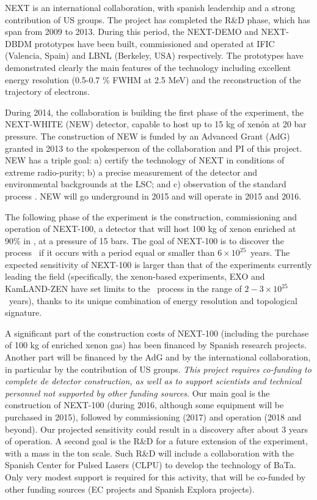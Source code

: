 \documentclass[a4paper,11pt,oneside]{article}
\begin{document}
NEXT is an international collaboration, with spanish leadership and a strong contribution of US groups. The project has completed the R\&D phase, which has span from 2009 to 2013. During this period, the NEXT-DEMO and NEXT-DBDM prototypes have been built, commissioned and operated at IFIC (Valencia, Spain) and LBNL (Berkeley, USA) respectively. The prototypes have demonstrated clearly the main features of the technology including excellent energy resolution (0.5-0.7 \% FWHM at 2.5 MeV) and the reconstruction of the trajectory of electrons.

During 2014, the collaboration is building the first phase of the experiment, the NEXT-WHITE (NEW) detector, capable to host up to 15 kg of xenón at 20 bar pressure. The construction of NEW is funded by an Advanced Grant (AdG) granted in 2013 to the spokesperson of the collaboration and PI of this project. NEW has a triple goal: a) certify the technology of NEXT in conditions of extreme radio-purity; b) a precise measurement of the detector and environmental backgrounds at the LSC; and c) observation of the standard process \bbtnu. NEW will go underground in 2015 and will operate in 2015 and 2016.  

The following phase of the experiment is the construction, commissioning and operation of NEXT-100, a detector that will host 100 kg of xenon enriched at 90\% in \XE, at a pressure of 15 bars. The goal of NEXT-100 is to discover the process \bbonu\ if it occurs with a period equal or smaller than  $6 \times 10^{25}$~years. The expected sensitivity of NEXT-100 is larger than that of the experiments currently leading the field (specifically, the xenon-based experiments, EXO and KamLAND-ZEN have set limits to the \bbonu\ process in the range of $2-3 \times 10^{25}$~years), thanks to its unique combination of energy resolution and topological signature. 

A significant part of the construction costs of NEXT-100 (including the purchase of 100 kg of enriched xenon gas) has been financed by Spanish research projects. Another part will be financed by the AdG and by the international collaboration, in particular by the contribution of US groups. {\em This project requires co-funding to complete de detector construction, as well as to support scientists and technical personnel not supported by other funding sources}. Our main goal is the construction of NEXT-100 (during 2016, although some equipment will be purchased in 2015), followed by commissioning (2017) and operation (2018 and beyond). Our projected sensitivity could result in a discovery after about 3 years of operation. A second goal is the R\&D for a future extension of the experiment, with a mass in the ton scale. Such R\&D will include a collaboration with the Spanish Center for Pulsed Lasers (CLPU) to develop the technology of  {\sc BaTa}. Only very modest support is required for this activity, that will be co-funded by other funding sources (EC projects and Spanish Explora projects). 
\end{document}
